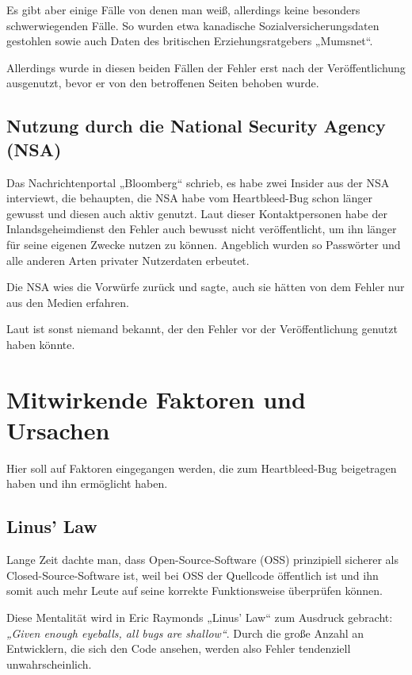 \documentclass[12pt]{article}
\begin{document}
Es gibt aber einige Fälle von denen man weiß, allerdings keine besonders schwerwiegenden Fälle. So wurden etwa kanadische Sozialversicherungsdaten gestohlen sowie auch Daten des britischen Erziehungsratgebers „Mumsnet“. 

Allerdings wurde in diesen beiden Fällen der Fehler erst nach der Veröffentlichung ausgenutzt, bevor er von den betroffenen Seiten behoben wurde. 

\subsection{Nutzung durch die National Security Agency (NSA)}

Das Nachrichtenportal „Bloomberg“ schrieb, es habe zwei Insider aus der NSA interviewt, die behaupten, die NSA habe vom Heartbleed-Bug schon länger gewusst und diesen auch aktiv genutzt. Laut dieser Kontaktpersonen habe der Inlandsgeheimdienst den Fehler auch bewusst nicht veröffentlicht, um ihn länger für seine eigenen Zwecke nutzen zu können. Angeblich wurden so Passwörter und alle anderen Arten privater Nutzerdaten erbeutet. \citep{riley_nsa_2014}

Die NSA wies die Vorwürfe zurück \citep{magid_nsa_2014} und sagte, auch sie hätten von dem Fehler nur aus den Medien erfahren. 

Laut \citet{riley_nsa_2014} ist sonst niemand bekannt, der den Fehler vor der Veröffentlichung genutzt haben könnte. 

\section{Mitwirkende Faktoren und Ursachen}

Hier soll auf Faktoren eingegangen werden, die zum Heartbleed-Bug beigetragen haben und ihn ermöglicht haben. 

\subsection{Linus' Law}

Lange Zeit dachte man, dass Open-Source-Software (OSS) prinzipiell sicherer als Closed-Source-Software ist, weil bei OSS der Quellcode öffentlich ist und ihn somit auch mehr Leute auf seine korrekte Funktionsweise überprüfen können. 

Diese Mentalität wird in Eric Raymonds „Linus' Law“ zum Ausdruck gebracht: \textit{„Given enough eyeballs, all bugs are shallow“}. Durch die große Anzahl an Entwicklern, die sich den Code ansehen, werden also Fehler tendenziell unwahrscheinlich. 
\end{document}
